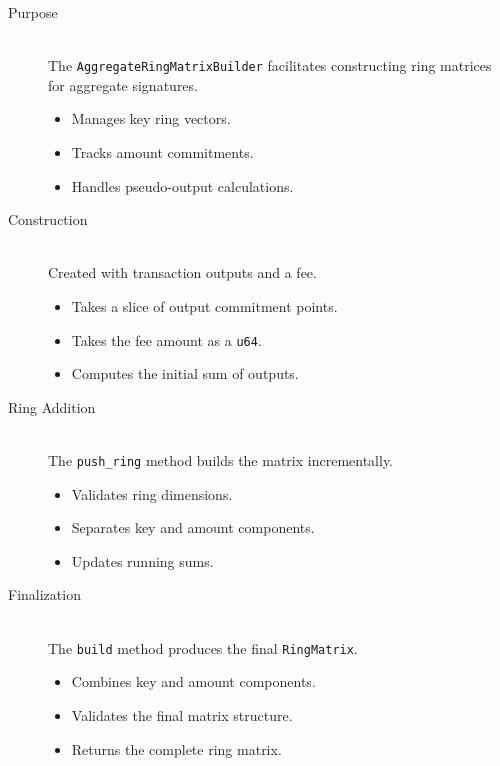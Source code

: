 \documentclass[12pt,a4paper]{article}
\begin{document}
\begin{description}
\item[Purpose] \hfill \\
The \texttt{AggregateRingMatrixBuilder} facilitates constructing ring matrices for aggregate
signatures.
\begin{itemize}
  \item Manages key ring vectors.
  \item Tracks amount commitments.
  \item Handles pseudo-output calculations.
\end{itemize}

\item[Construction] \hfill \\
Created with transaction outputs and a fee.
\begin{itemize}
  \item Takes a slice of output commitment points.
  \item Takes the fee amount as a \texttt{u64}.
  \item Computes the initial sum of outputs.
\end{itemize}

\item[Ring Addition] \hfill \\
The \texttt{push\_ring} method builds the matrix incrementally.
\begin{itemize}
  \item Validates ring dimensions.
  \item Separates key and amount components.
  \item Updates running sums.
\end{itemize}

\item[Finalization] \hfill \\
The \texttt{build} method produces the final \texttt{RingMatrix}.
\begin{itemize}
  \item Combines key and amount components.
  \item Validates the final matrix structure.
  \item Returns the complete ring matrix.
\end{itemize}
\end{description}
\end{document}
